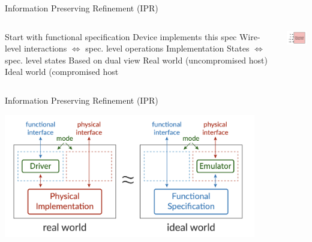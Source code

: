 \begin{frame}{Information Preserving Refinement (IPR)}
  \begin{columns}
  \begin{outline}
    \1 Start with functional specification 
    \1 Device implements this spec
    \1 Wire-level interactions $\iff$ spec. level operations 
    \1 Implementation States $\iff$ spec. level states
    \1 Based on dual view
    \2 Real world (uncompromised host)
    \2 Ideal world (compromised host
  \end{outline}

  \centering
  \begin{center}
  
    \vspace{0.5cm}

    
    \includegraphics[width=3cm]{wire_diagram.png}
  \end{center}
\end{columns}
\end{frame}

\begin{frame}{Information Preserving Refinement (IPR)}
  \centering
  \begin{center}
    \includegraphics[width=11cm]{ipr.png}
  \end{center}

\end{frame}

